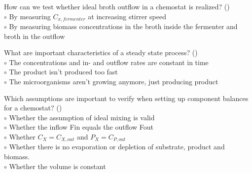 \documentclass[]{beamer}
\begin{document}
\begin{frame}[shrink] {}
\addtocounter{questions}{1}
\color{blue}
How can we test whether ideal broth outflow in a chemostat is realized? ()\\
\color{black}
\setlength{\parindent}{-0.4cm}
{\color{red}$\circ$}  By measuring $C_{x,fermenter}$ at increasing stirrer speed\\
{\color{red}$\circ$} By measuring biomass concentrations in the broth inside the fermenter and broth in the outflow \\
\end{frame}

\begin{frame}[shrink] {}
\addtocounter{questions}{1}
\color{blue}
 What are important characteristics of a steady state process? ()\\
\color{black}
\setlength{\parindent}{-0.4cm}
{\color{red}$\circ$}   The concentrations and in- and outflow rates are constant in time \\
{\color{red}$\circ$} The product isn’t produced too fast\\
{\color{red}$\circ$} The microorganisms aren’t growing anymore, just producing product \\
\end{frame}

\begin{frame}[shrink] {}
\addtocounter{questions}{1}
\color{blue}
Which assumptions are important to verify when setting up component balances for a chemostat? ()\\
\color{black}
\setlength{\parindent}{-0.4cm}
{\color{red}$\circ$} Whether the assumption of ideal mixing is valid\\
{\color{red}$\circ$} Whether the inflow Fin equals the outflow Fout\\
{\color{red}$\circ$} Whether $C_X = C_{X,out}$ and $P_X = C_{P,out}$ \\
{\color{red}$\circ$} Whether there is no evaporation or depletion of substrate, product and biomass.\\
{\color{red}$\circ$} Whether the volume is constant  \\
\end{frame}
\end{document}
